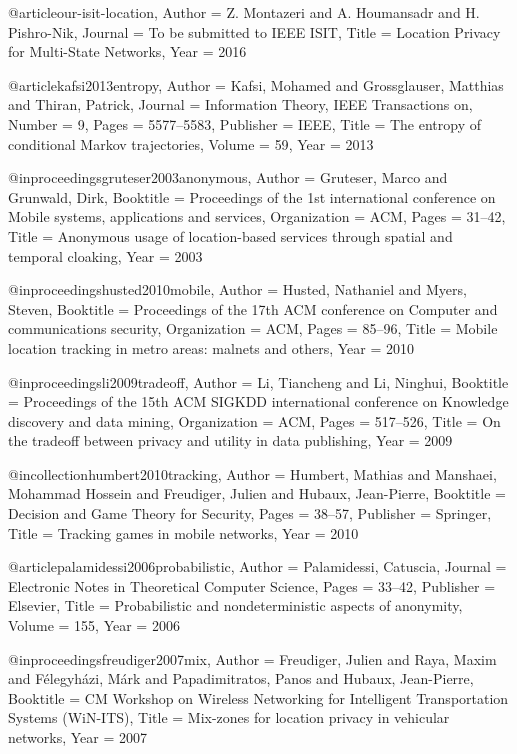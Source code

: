 {{@article{our-isit-location,
	Author = {Z. Montazeri and A. Houmansadr and H. Pishro-Nik},
	Journal = {To be submitted to IEEE ISIT},
	Title = {Location Privacy for Multi-State Networks},
	Year = {2016}}






@article{kafsi2013entropy,
	Author = {Kafsi, Mohamed and Grossglauser, Matthias and Thiran, Patrick},
	Journal = {Information Theory, IEEE Transactions on},
	Number = {9},
	Pages = {5577--5583},
	Publisher = {IEEE},
	Title = {The entropy of conditional Markov trajectories},
	Volume = {59},
	Year = {2013}}

@inproceedings{gruteser2003anonymous,
	Author = {Gruteser, Marco and Grunwald, Dirk},
	Booktitle = {Proceedings of the 1st international conference on Mobile systems, applications and services},
	Organization = {ACM},
	Pages = {31--42},
	Title = {Anonymous usage of location-based services through spatial and temporal cloaking},
	Year = {2003}}

@inproceedings{husted2010mobile,
	Author = {Husted, Nathaniel and Myers, Steven},
	Booktitle = {Proceedings of the 17th ACM conference on Computer and communications security},
	Organization = {ACM},
	Pages = {85--96},
	Title = {Mobile location tracking in metro areas: malnets and others},
	Year = {2010}}

@inproceedings{li2009tradeoff,
	Author = {Li, Tiancheng and Li, Ninghui},
	Booktitle = {Proceedings of the 15th ACM SIGKDD international conference on Knowledge discovery and data mining},
	Organization = {ACM},
	Pages = {517--526},
	Title = {On the tradeoff between privacy and utility in data publishing},
	Year = {2009}}





@incollection{humbert2010tracking,
	Author = {Humbert, Mathias and Manshaei, Mohammad Hossein and Freudiger, Julien and Hubaux, Jean-Pierre},
	Booktitle = {Decision and Game Theory for Security},
	Pages = {38--57},
	Publisher = {Springer},
	Title = {Tracking games in mobile networks},
	Year = {2010}}


@article{palamidessi2006probabilistic,
	Author = {Palamidessi, Catuscia},
	Journal = {Electronic Notes in Theoretical Computer Science},
	Pages = {33--42},
	Publisher = {Elsevier},
	Title = {Probabilistic and nondeterministic aspects of anonymity},
	Volume = {155},
	Year = {2006}}



@inproceedings{freudiger2007mix,
	Author = {Freudiger, Julien and Raya, Maxim and F{\'e}legyh{\'a}zi, M{\'a}rk and Papadimitratos, Panos and Hubaux, Jean-Pierre},
	Booktitle = {CM Workshop on Wireless Networking for Intelligent Transportation Systems (WiN-ITS)},
	Title = {Mix-zones for location privacy in vehicular networks},
	Year = {2007}}



}}
